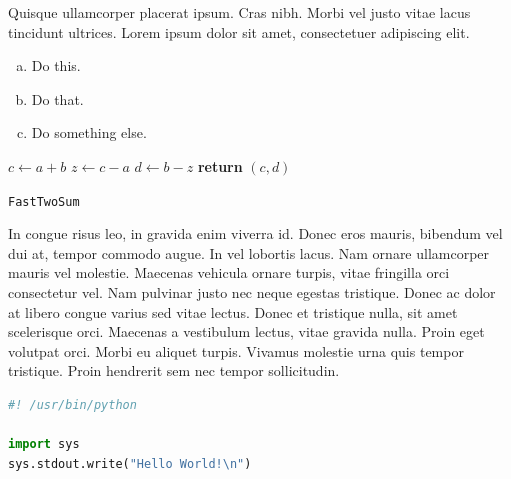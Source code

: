 \documentclass{article}
\begin{document}
\begin{question}
	Quisque ullamcorper placerat ipsum. Cras nibh. Morbi vel justo vitae lacus tincidunt ultrices. Lorem ipsum dolor sit amet, consectetuer adipiscing elit.

	\begin{enumerate}[(a)]
		\item Do this.
		\item Do that.
		\item Do something else.
	\end{enumerate}
\end{question}
	


\begin{center}
	\begin{minipage}{0.5\linewidth} %
		\begin{algorithm}[H]
			\medskip
			$c \leftarrow a + b$ \;
			$z \leftarrow c - a$ \;
			$d \leftarrow b - z$ \;
			{\bf return} $(c,d)$ \;
			\caption{\texttt{FastTwoSum}} %
			\label{alg:fastTwoSum}   %
		\end{algorithm}
	\end{minipage}
\end{center}

\begin{question}
	In congue risus leo, in gravida enim viverra id. Donec eros mauris, bibendum vel dui at, tempor commodo augue. In vel lobortis lacus. Nam ornare ullamcorper mauris vel molestie. Maecenas vehicula ornare turpis, vitae fringilla orci consectetur vel. Nam pulvinar justo nec neque egestas tristique. Donec ac dolor at libero congue varius sed vitae lectus. Donec et tristique nulla, sit amet scelerisque orci. Maecenas a vestibulum lectus, vitae gravida nulla. Proin eget volutpat orci. Morbi eu aliquet turpis. Vivamus molestie urna quis tempor tristique. Proin hendrerit sem nec tempor sollicitudin.
\end{question}


\begin{file}[hello.py]
\begin{lstlisting}[language=Python]
#! /usr/bin/python

import sys
sys.stdout.write("Hello World!\n")
\end{lstlisting}
\end{file}
\end{document}
